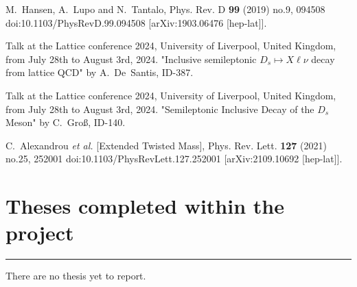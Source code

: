 \documentclass [a4paper, 11pt]{article}
\begin{document}
\begin{thebibliography}{99}
	M.~Hansen, A.~Lupo and N.~Tantalo,
	Phys. Rev. D \textbf{99} (2019) no.9, 094508
	doi:10.1103/PhysRevD.99.094508
	[arXiv:1903.06476 [hep-lat]].

	Talk at the Lattice conference 2024, University of Liverpool, United Kingdom, from July 28th to August 3rd, 2024.
	"Inclusive semileptonic $D_s\mapsto X \ell \nu$ decay from lattice QCD" by A.~De~Santis, ID-387.

	Talk at the Lattice conference 2024, University of Liverpool, United Kingdom, from July 28th to August 3rd, 2024.
	"Semileptonic Inclusive Decay of the $D_s$ Meson" by C.~Gro\ss, ID-140.


	C.~Alexandrou \textit{et al.} [Extended Twisted Mass],
	Phys. Rev. Lett. \textbf{127} (2021) no.25, 252001
	doi:10.1103/PhysRevLett.127.252001
	[arXiv:2109.10692 [hep-lat]].

\end{thebibliography}


\section{Theses completed within the project}
\rule{\textwidth}{0.4pt}

There are no thesis yet to report.
\end{document}
